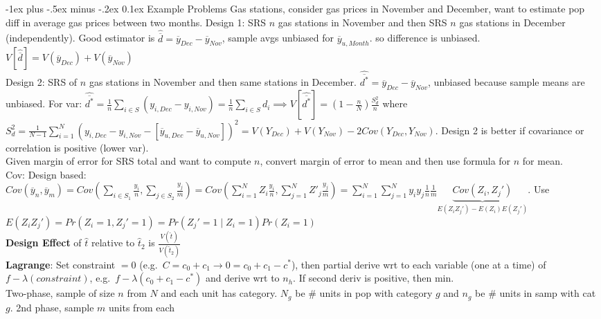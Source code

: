 \documentclass[landscape]{article}
\makeatletter
\renewcommand{\section}{\@startsection{section}{1}{0mm}%
                                {-1ex plus -.5ex minus -.2ex}%
                                {0.1ex}%
                                {\color{blue}\normalfont\large\bfseries}}
\makeatother
\begin{document}
\begin{multicols*}{3}
\section{Example Problems}
Gas stations, consider gas prices in November and December, want to
estimate pop diff in average gas prices between two months. Design 1:
SRS $n$ gas stations in November and then SRS $n$ gas stations in
December (independently). Good estimator is $\hat{\overline{d}} =
\overline{y}_{Dec} - \overline{y}_{Nov}$, sample avgs unbiased for
$\overline{y}_{u,Month}$. so difference is
unbiased. $V[\hat{\overline{d}}] = V(\overline{y}_{Dec}) +
V(\overline{y}_{Nov})$
\\ Design 2: SRS of $n$ gas stations in November and then same
stations in December. $\hat{\overline{d^*}} = \overline{y}_{Dec} -
\overline{y}_{Nov}$, unbiased because sample means are unbiased. For
var: $\hat{\overline{d^*}} = \frac{1}{n} \sum_{i \in S} (y_{i, Dec} -
y_{i, Nov}) = \frac{1}{n} \sum_{i \in S} d_i \implies
V[\hat{\overline{d^*}}] = \left(1 - \frac{n}{N}\right)\frac{S_d^2}{n}$
where $S_d^2 = \frac{1}{N-1} \sum_{i=1}^N (y_{i,Dec} - y_{i,Nov} -
[\overline{y}_{u,Dec} - \overline{y}_{u, Nov}])^2 = V(Y_{Dec}) +
V(Y_{Nov}) - 2Cov(Y_{Dec}, Y_{Nov})$. Design 2 is better if covariance
or correlation is positive (lower var).
\\ Given margin of error for SRS total and want to compute $n$,
convert margin of error to mean and then use formula for $n$ for mean.
\\ Cov: Design based: $Cov(\overline{y}_n, \overline{y}_m) = Cov
\left(\sum_{i \in S_1} \frac{y_i}{n}, \sum_{j\in S_2}
  \frac{y_j}{m}\right) = Cov \left(\sum_{i=1}^N Z_i \frac{y_i}{n},
  \sum_{j=1}^N Z'_j \frac{y_j}{m}\right) = \sum_{i=1}^N \sum_{j=1}^N
y_i y_j \frac{1}{n} \frac{1}{m} \underbrace{Cov (Z_i,
  Z_j')}_{E(Z_iZ_j') - E(Z_i)E(Z_j')}$. Use $E(Z_i Z_j') = Pr(Z_i = 1,
Z_j'=1) = Pr(Z_j' = 1 \mid Z_i = 1)Pr(Z_i = 1)$
\\ \textbf{Design Effect} of $\hat{t}$ relative to $\hat{t}_2$ is
$\frac{V(\hat{t})}{V(\hat{t}_2)}$
\\ \textbf{Lagrange}: Set constraint $= 0$ (e.g.\ $C = c_0 + c_1 \to 0
= c_0 + c_1 - c^*$), then partial derive wrt to
each variable (one at a time) of $f - \lambda(constraint)$, e.g.\ $f -
\lambda (c_0 + c_1 - c^*)$ and derive wrt to $n_h$. If second deriv is
positive, then min.
\\Two-phase, sample of size $n$ from $N$ and each unit has
category. $N_g$ be \# units in pop with category $g$ and $n_g$ be \#
units in samp with cat $g$. 2nd phase, sample $m$ units from each

\end{multicols*}
\end{document}

